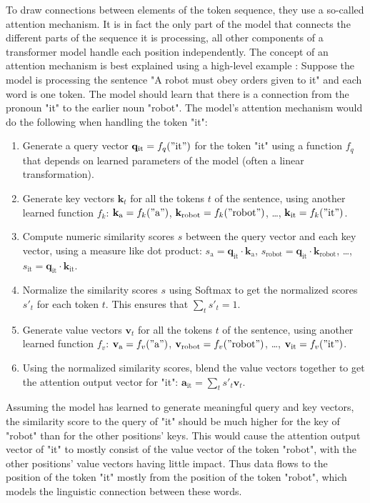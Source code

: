 To draw connections between elements of the token sequence, they use a so-called attention mechanism. It is in fact the only part of the model that connects the different parts of the sequence it is processing, all other components of a transformer model handle each position independently. The concept of an attention mechanism is best explained using a high-level example \cite{alammar-gpt2}: Suppose the model is processing the sentence "A robot must obey orders given to it" and each word is one token. The model should learn that there is a connection from the pronoun "it" to the earlier noun "robot".
The model's attention mechanism would do the following when handling the token "it":
\begin{enumerate}
	\item Generate a query vector $\mathbf{q}_{\mathrm{it}} = f_q("\mathrm{it}")$ for the token "it" using a function $f_q$ that depends on learned parameters of the model (often a linear transformation).
	\item Generate key vectors $\mathbf{k}_t$ for all the tokens $t$ of the sentence, using another learned function $f_k$: $\mathbf{k}_{\mathrm{a}} = f_k(\mathrm{"a"})$, $\mathbf{k}_{\mathrm{robot}} = f_k(\mathrm{"robot"})$, \ldots, $\mathbf{k}_{\mathrm{it}} = f_k(\mathrm{"it")}$.
	\item Compute numeric similarity scores $s$ between the query vector and each key vector, using a measure like dot product: $s_{\mathrm{a}} = \mathbf{\mathbf{q}}_{\mathrm{it}} \cdot \mathbf{k}_{\mathrm{a}}$, $s_{\mathrm{robot}} = \mathbf{q}_{\mathrm{it}} \cdot \mathbf{k}_{\mathrm{robot}}$, \ldots, $s_{\mathrm{it}} = \mathbf{q}_{\mathrm{it}} \cdot \mathbf{k}_{\mathrm{it}}$.
	\item Normalize the similarity scores $s$ using Softmax to get the normalized scores $s'_t$ for each token $t$. This ensures that $\sum_t s'_t = 1$.
	\item Generate value vectors $\mathbf{v}_t$ for all the tokens $t$ of the sentence, using another learned function $f_v$: $\mathbf{v}_{\mathrm{a}} = f_v(\mathrm{"a"})$, $\mathbf{v}_{\mathrm{robot}} = f_v(\mathrm{"robot"})$, \ldots, $\mathbf{v}_{\mathrm{it}} = f_v(\mathrm{"it")}$.
	\item Using the normalized similarity scores, blend the value vectors together to get the attention output vector for "it": $\mathbf{a}_{\mathrm{it}} = \sum_t s'_t \mathbf{v}_t$. 
\end{enumerate}

Assuming the model has learned to generate meaningful query and key vectors, the similarity score to the query of "it" should be much higher for the key of "robot" than for the other positions' keys. This would cause the attention output vector of "it" to mostly consist of the value vector of the token "robot", with the other positions' value vectors having little impact. Thus data flows to the position of the token "it" mostly from the position of the token "robot", which models the linguistic connection between these words.

